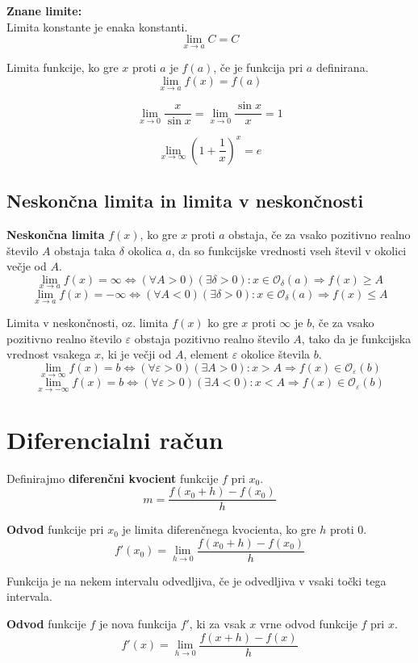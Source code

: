 \documentclass[a4paper,oneside,12pt,fleqn]{article}
\def\limh{\lim_{h\rightarrow0}} %
\renewcommand\implies\Rightarrow
\renewcommand\iff\Leftrightarrow
\numberwithin{equation}{section}
\begin{document}
\textbf{Znane limite:}\\
Limita konstante je enaka konstanti.
\[ \lim_{x\rightarrow a}C = C \]

Limita funkcije, ko gre $x$ proti $a$ je $f(a)$, če je funkcija pri $a$ definirana.
\[ \lim_{x\rightarrow a}f(x) = f(a) \]

\[ \lim_{x\rightarrow 0} \frac{x}{\sin{x}} = \lim_{x\rightarrow 0} \frac{\sin{x}}{x} = 1 \]

\[\lim_{x\rightarrow\infty} \left( 1+\frac{1}{x} \right)^x = e \]

\subsection{Neskončna limita in limita v neskončnosti}
\textbf{Neskončna limita} $f(x)$, ko gre $x$ proti $a$ obstaja, če za vsako pozitivno realno število $A$
obstaja taka $\delta$ okolica $a$, da so funkcijske vrednosti vseh števil v okolici večje
od $A$.
\[ \lim_{x\rightarrow a}f(x) = \infty \iff (\forall A > 0)(\exists \delta > 0): x \in
\mathcal{O}_\delta(a) \implies f(x) \ge A \]
\[ \lim_{x\rightarrow a}f(x) = -\infty \iff (\forall A < 0)(\exists \delta > 0): x \in
\mathcal{O}_\delta(a) \implies f(x) \le A \]

Limita v neskončnosti, oz. limita $f(x)$ ko gre $x$ proti $\infty$ je $b$, če za vsako
pozitivno realno število $\varepsilon$ obstaja pozitivno realno število $A$, tako da je
funkcijska vrednost vsakega $x$, ki je večji od $A$, element $\varepsilon$ okolice števila $b$.
\[ \lim_{x\rightarrow\infty}f(x) = b \iff (\forall\varepsilon>0)(\exists A>0): x > A
\implies f(x) \in \mathcal{O}_\varepsilon(b) \]
\[ \lim_{x\rightarrow-\infty}f(x) = b \iff (\forall\varepsilon>0)(\exists A<0): x < A
\implies f(x) \in \mathcal{O}_\varepsilon(b) \]

\section{Diferencialni račun}
\label{sec:odvod}
Definirajmo \textbf{diferenčni kvocient} funkcije $f$ pri $x_0$.
\[ m = \frac{f(x_0 + h) - f(x_0)}{h} \]

\textbf{Odvod} funkcije pri $x_0$ je limita diferenčnega kvocienta, ko gre $h$ proti 0.
\[ f'(x_0) = \limh  \frac{f(x_0+h)-f(x_0)}{h} \]

Funkcija je na nekem intervalu odvedljiva, če je odvedljiva v vsaki točki tega intervala.

\textbf{Odvod} funkcije $f$ je nova funkcija $f'$, ki za vsak $x$ vrne odvod funkcije $f$
pri $x$.
\begin{equation}
  f'(x) = \limh  \frac{f(x+h)-f(x)}{h}
  \label{eq:odv:def}
\end{equation}
\end{document}
